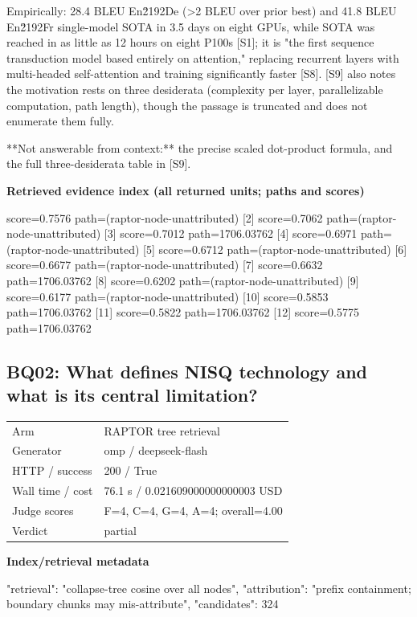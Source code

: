 \documentclass[10pt]{article}
\begin{document}
\begin{AnswerText}
Empirically: 28.4 BLEU En\u2192De (>2 BLEU over prior best) and 41.8 BLEU En\u2192Fr single-model SOTA in 3.5 days on eight GPUs, while SOTA was reached in as little as 12 hours on eight P100s [S1]; it is "the first sequence transduction model based entirely on attention," replacing recurrent layers with multi-headed self-attention and training significantly faster [S8]. [S9] also notes the motivation rests on three desiderata (complexity per layer, parallelizable computation, path length), though the passage is truncated and does not enumerate them fully.

**Not answerable from context:** the precise scaled dot-product formula, and the full three-desiderata table in [S9].
\end{AnswerText}

\textbf{Retrieved evidence index (all returned units; paths and scores) }
\begin{EvidenceText}
[1] score=0.7576 path=(raptor-node-unattributed)
[2] score=0.7062 path=(raptor-node-unattributed)
[3] score=0.7012 path=1706.03762
[4] score=0.6971 path=(raptor-node-unattributed)
[5] score=0.6712 path=(raptor-node-unattributed)
[6] score=0.6677 path=(raptor-node-unattributed)
[7] score=0.6632 path=1706.03762
[8] score=0.6202 path=(raptor-node-unattributed)
[9] score=0.6177 path=(raptor-node-unattributed)
[10] score=0.5853 path=1706.03762
[11] score=0.5822 path=1706.03762
[12] score=0.5775 path=1706.03762
\end{EvidenceText}
\subsection{BQ02: What defines NISQ technology and what is its central limitation?}
\begin{tabular}{@{}ll@{}}
Arm & RAPTOR tree retrieval\\
Generator & omp / deepseek-flash\\
HTTP / success & 200 / True\\
Wall time / cost & 76.1 s / 0.021609000000000003 USD\\
Judge scores & F=4, C=4, G=4, A=4; overall=4.00\\
Verdict & partial\\
\end{tabular}

\textbf{Index/retrieval metadata}
\begin{EvidenceText}
{
  "retrieval": "collapse-tree cosine over all nodes",
  "attribution": "prefix containment; boundary chunks may mis-attribute",
  "candidates": 324
}
\end{EvidenceText}
\end{document}
